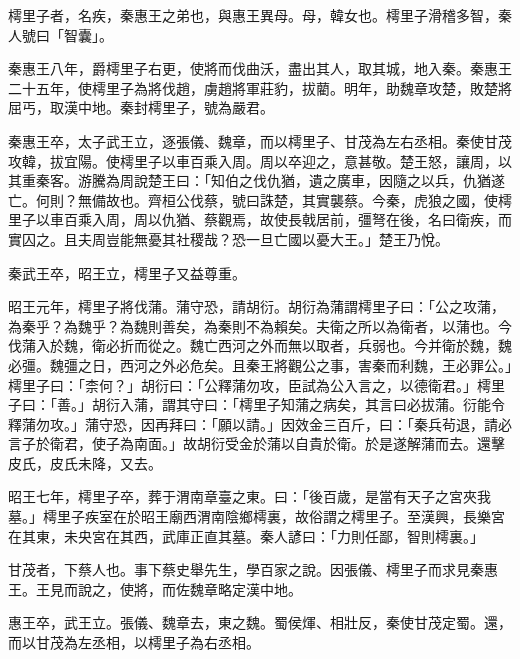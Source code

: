 
\begin{pinyinscope}
樗里子者，名疾，秦惠王之弟也，與惠王異母。母，韓女也。樗里子滑稽多智，秦人號曰「智囊」。

秦惠王八年，爵樗里子右更，使將而伐曲沃，盡出其人，取其城，地入秦。秦惠王二十五年，使樗里子為將伐趙，虜趙將軍莊豹，拔藺。明年，助魏章攻楚，敗楚將屈丐，取漢中地。秦封樗里子，號為嚴君。

秦惠王卒，太子武王立，逐張儀、魏章，而以樗里子、甘茂為左右丞相。秦使甘茂攻韓，拔宜陽。使樗里子以車百乘入周。周以卒迎之，意甚敬。楚王怒，讓周，以其重秦客。游騰為周說楚王曰：「知伯之伐仇猶，遺之廣車，因隨之以兵，仇猶遂亡。何則？無備故也。齊桓公伐蔡，號曰誅楚，其實襲蔡。今秦，虎狼之國，使樗里子以車百乘入周，周以仇猶、蔡觀焉，故使長戟居前，彊弩在後，名曰衛疾，而實囚之。且夫周豈能無憂其社稷哉？恐一旦亡國以憂大王。」楚王乃悅。

秦武王卒，昭王立，樗里子又益尊重。

昭王元年，樗里子將伐蒲。蒲守恐，請胡衍。胡衍為蒲謂樗里子曰：「公之攻蒲，為秦乎？為魏乎？為魏則善矣，為秦則不為賴矣。夫衛之所以為衛者，以蒲也。今伐蒲入於魏，衛必折而從之。魏亡西河之外而無以取者，兵弱也。今并衛於魏，魏必彊。魏彊之日，西河之外必危矣。且秦王將觀公之事，害秦而利魏，王必罪公。」樗里子曰：「柰何？」胡衍曰：「公釋蒲勿攻，臣試為公入言之，以德衛君。」樗里子曰：「善。」胡衍入蒲，謂其守曰：「樗里子知蒲之病矣，其言曰必拔蒲。衍能令釋蒲勿攻。」蒲守恐，因再拜曰：「願以請。」因效金三百斤，曰：「秦兵茍退，請必言子於衛君，使子為南面。」故胡衍受金於蒲以自貴於衛。於是遂解蒲而去。還擊皮氏，皮氏未降，又去。

昭王七年，樗里子卒，葬于渭南章臺之東。曰：「後百歲，是當有天子之宮夾我墓。」樗里子疾室在於昭王廟西渭南陰鄉樗裏，故俗謂之樗里子。至漢興，長樂宮在其東，未央宮在其西，武庫正直其墓。秦人諺曰：「力則任鄙，智則樗裏。」

甘茂者，下蔡人也。事下蔡史舉先生，學百家之說。因張儀、樗里子而求見秦惠王。王見而說之，使將，而佐魏章略定漢中地。

惠王卒，武王立。張儀、魏章去，東之魏。蜀侯煇、相壯反，秦使甘茂定蜀。還，而以甘茂為左丞相，以樗里子為右丞相。


\end{pinyinscope}
